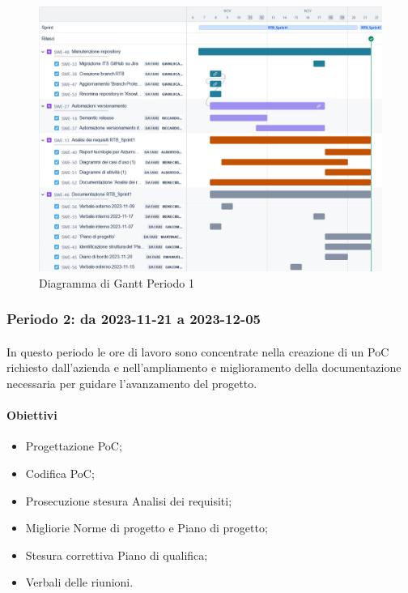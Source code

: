 \documentclass[10pt, a4paper]{article}
\begin{document}
{{{{{{{{ \begin{figure}[H]
        \centering        
        \includegraphics[width=15.5cm]{ganttPeriodo1.png}
        \caption{Diagramma di Gantt Periodo 1 }
    \end{figure}

\subsubsection{Periodo 2: da 2023-11-21 a 2023-12-05}
\paragraph{}In questo periodo le ore di lavoro sono concentrate nella creazione di un PoC richiesto dall'azienda e nell'ampliamento e miglioramento della documentazione necessaria per guidare l'avanzamento del progetto.
\paragraph{Obiettivi}
\begin{itemize}
    \item Progettazione PoC;
    \item Codifica PoC;
    \item Prosecuzione stesura Analisi dei requisiti;
    \item Migliorie Norme di progetto e Piano di progetto;
    \item Stesura correttiva Piano di qualifica;
    \item Verbali delle riunioni.
  

\end{itemize}}}}}}}}}
\end{document}
